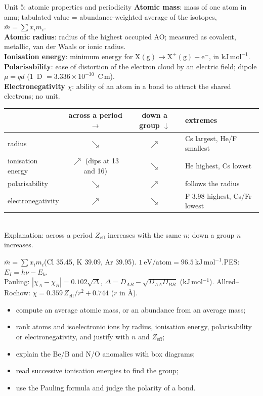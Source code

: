 \clearpage
\begin{recap}{Unit 5: atomic properties and periodicity}
\textbf{Atomic mass}: mass of one atom in amu; tabulated value = abundance-weighted average of the isotopes,
$\bar m = \sum x_i m_i$.\\
\textbf{Atomic radius}: radius of the highest occupied AO; measured as covalent, metallic, van der Waals
or ionic radius.\\
\textbf{Ionisation energy}: minimum energy for $\mathrm X(\mathrm g)\to\mathrm X^+(\mathrm g) + \mathrm e^-$,
in $\mathrm{kJ\,mol^{-1}}$.\\
\textbf{Polarisability}: ease of distortion of the electron cloud by an electric field; dipole
$\mu = qd$ (1~D $= 3.336\times10^{-30}$~C\,m).\\
\textbf{Electronegativity} $\chi$: ability of an atom in a bond to attract the shared electrons; no unit.

\begin{tabular}{@{}l c c l@{}}
\toprule
 & across a period $\rightarrow$ & down a group $\downarrow$ & extremes\\ \midrule
radius & $\searrow$ & $\nearrow$ & Cs largest, He/F smallest\\
ionisation energy & $\nearrow$ (dips at 13 and 16) & $\searrow$ & He highest, Cs lowest\\
polarisability & $\searrow$ & $\nearrow$ & follows the radius\\
electronegativity & $\nearrow$ & $\searrow$ & F 3.98 highest, Cs/Fr lowest\\ \bottomrule
\end{tabular}\\[2pt]
Explanation: across a period $Z_\mathrm{eff}$ increases with the same $n$; down a group $n$ increases.

$\bar m = \sum x_i m_i$\quad(Cl 35.45, K 39.09, Ar 39.95).\quad
$1\ \mathrm{eV/atom} = 96.5\ \mathrm{kJ\,mol^{-1}}$.\quad PES: $E_I = h\nu - E_k$.\\
Pauling: $|\chi_A - \chi_B| = 0.102\sqrt{\Delta}$, $\Delta = D_{AB} - \sqrt{D_{AA}D_{BB}}$ (kJ\,mol$^{-1}$).\quad
Allred--Rochow: $\chi = 0.359\,Z_\mathrm{eff}/r^2 + 0.744$ ($r$ in \AA).

\begin{itemize}
  \item compute an average atomic mass, or an abundance from an average mass;
  \item rank atoms and isoelectronic ions by radius, ionisation energy, polarisability or electronegativity,
        and justify with $n$ and $Z_\mathrm{eff}$;
  \item explain the Be/B and N/O anomalies with box diagrams;
  \item read successive ionisation energies to find the group;
  \item use the Pauling formula and judge the polarity of a bond.
\end{itemize}
\end{recap}
